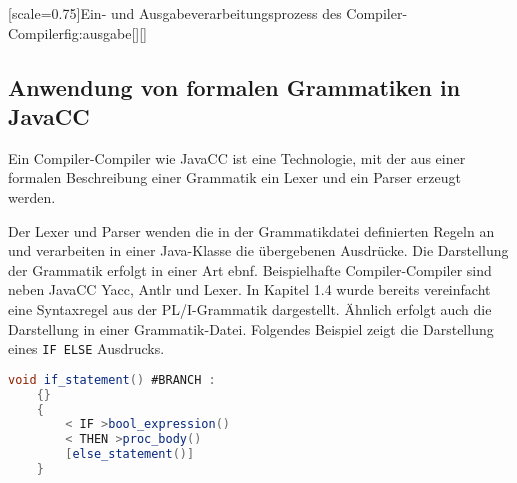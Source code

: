 [scale=0.75]{Ein- und Ausgabeverarbeitungsprozess des Compiler-Compiler}{fig:ausgabe}[][]





     
\pagebreak
\subsection{Anwendung von formalen Grammatiken in JavaCC}

Ein Compiler-Compiler wie JavaCC ist eine Technologie, mit der aus einer formalen Beschreibung einer Grammatik ein Lexer und ein Parser erzeugt werden. 

Der Lexer und Parser wenden die in der Grammatikdatei definierten Regeln an und verarbeiten in einer Java-Klasse die übergebenen Ausdrücke.
Die Darstellung der Grammatik erfolgt in einer Art \ac{ebnf}.  Beispielhafte Compiler-Compiler sind neben JavaCC Yacc, Antlr und Lexer. In Kapitel 1.4 wurde bereits vereinfacht eine Syntaxregel aus der PL/I-Grammatik dargestellt. Ähnlich erfolgt auch die Darstellung in einer Grammatik-Datei. Folgendes Beispiel zeigt die Darstellung eines \verb+IF ELSE+ Ausdrucks. 


\begin{lstlisting}[language=Java, caption=JavaCC Syntaxregel einer Verzweigung, label={lst:ifstatement}]
	void if_statement() #BRANCH :
	{}
	{
		< IF >bool_expression()
		< THEN >proc_body()
		[else_statement()]
	}
\end{lstlisting}

